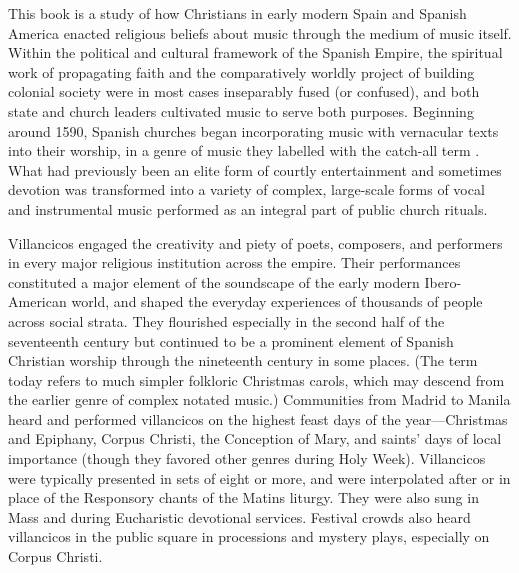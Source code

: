 This book is a study of how Christians in early modern Spain and Spanish
America enacted religious beliefs about music through the medium of music
itself.
Within the political and cultural framework of the Spanish Empire, the
spiritual work of propagating faith and the comparatively worldly project of
building colonial society were in most cases inseparably fused (or confused),
and both state and church leaders cultivated music to serve both purposes.
Beginning around 1590, Spanish churches began incorporating music with
vernacular texts into their worship, in a genre of music they labelled with the
catch-all term .
What had previously been an elite form of courtly entertainment and sometimes
devotion was transformed into a variety of complex, large-scale forms of vocal
and instrumental music performed as an integral part of public church rituals.

Villancicos engaged the creativity and piety of poets, composers, and
performers in every major religious institution across the empire.
Their performances constituted a major element of the soundscape of the early
modern Ibero-American world, and shaped the everyday experiences of thousands
of people across social strata.
They flourished especially in the second half of the seventeenth century but
continued to be a prominent element of Spanish Christian worship through the
nineteenth century in some places.
(The term today refers to much simpler folkloric Christmas carols, which may
descend from the earlier genre of complex notated music.)
Communities from Madrid to Manila heard and performed villancicos on the
highest feast days of the year---Christmas and Epiphany, Corpus Christi, the
Conception of Mary, and saints' days of local importance (though they
favored other genres during Holy Week).
Villancicos were typically presented in sets of eight or more, and were
interpolated after or in place of the Responsory chants of the Matins liturgy.
They were also sung in Mass and during Eucharistic devotional services.
Festival crowds also heard villancicos in the public square in processions and
mystery plays, especially on Corpus Christi.

